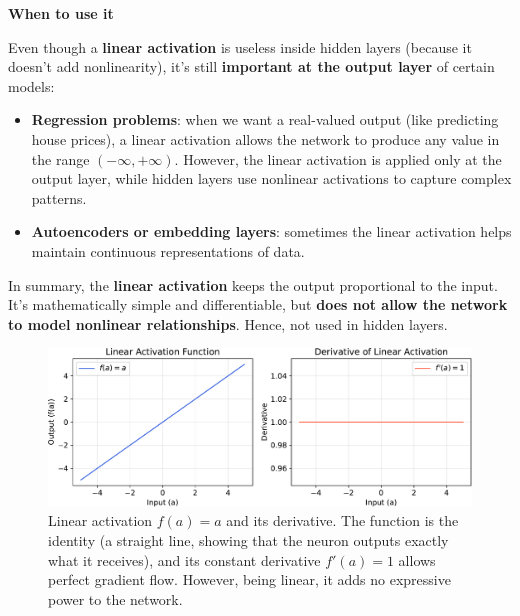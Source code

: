 \begin{flushleft}
    \textcolor{Green3}{ \textbf{When to use it}}
\end{flushleft}
Even though a \textbf{linear activation} is useless inside hidden layers (because it doesn't add nonlinearity), it's still \textbf{important at the output layer} of certain models:
\begin{itemize}
    \item \textbf{Regression problems}: when we want a real-valued output (like predicting house prices), a linear activation allows the network to produce any value in the range $(-\infty, +\infty)$. However, the linear activation is applied only at the output layer, while hidden layers use nonlinear activations to capture complex patterns.
    \item \textbf{Autoencoders or embedding layers}: sometimes the linear activation helps maintain continuous representations of data.
\end{itemize}
In summary, the \textbf{linear activation} keeps the output proportional to the input. It's mathematically simple and differentiable, but \textbf{does not allow the network to model nonlinear relationships}. Hence, not used in hidden layers.

\begin{figure}[!htp]
    \centering
    \includegraphics[width=\textwidth]{img/fnns/linear-activation-function.pdf}
    \caption{Linear activation $f(a) = a$ and its derivative. The function is the identity (a straight line, showing that the neuron outputs exactly what it receives), and its constant derivative $f'(a) = 1$ allows perfect gradient flow. However, being linear, it adds no expressive power to the network.}
\end{figure}